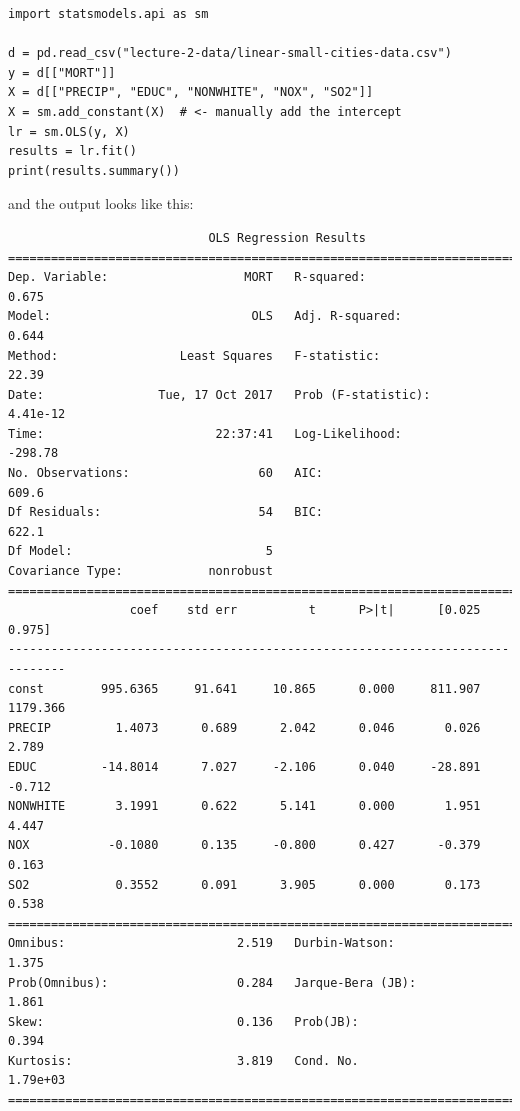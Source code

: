 {\small
\begin{verbatim}
import statsmodels.api as sm

d = pd.read_csv("lecture-2-data/linear-small-cities-data.csv")
y = d[["MORT"]]
X = d[["PRECIP", "EDUC", "NONWHITE", "NOX", "SO2"]]
X = sm.add_constant(X)  # <- manually add the intercept
lr = sm.OLS(y, X)
results = lr.fit()
print(results.summary())
\end{verbatim}
}
\noindent and the output looks like this:
{\small
\begin{verbatim}
                            OLS Regression Results                            
==============================================================================
Dep. Variable:                   MORT   R-squared:                       0.675
Model:                            OLS   Adj. R-squared:                  0.644
Method:                 Least Squares   F-statistic:                     22.39
Date:                Tue, 17 Oct 2017   Prob (F-statistic):           4.41e-12
Time:                        22:37:41   Log-Likelihood:                -298.78
No. Observations:                  60   AIC:                             609.6
Df Residuals:                      54   BIC:                             622.1
Df Model:                           5                                         
Covariance Type:            nonrobust                                         
==============================================================================
                 coef    std err          t      P>|t|      [0.025      0.975]
------------------------------------------------------------------------------
const        995.6365     91.641     10.865      0.000     811.907    1179.366
PRECIP         1.4073      0.689      2.042      0.046       0.026       2.789
EDUC         -14.8014      7.027     -2.106      0.040     -28.891      -0.712
NONWHITE       3.1991      0.622      5.141      0.000       1.951       4.447
NOX           -0.1080      0.135     -0.800      0.427      -0.379       0.163
SO2            0.3552      0.091      3.905      0.000       0.173       0.538
==============================================================================
Omnibus:                        2.519   Durbin-Watson:                   1.375
Prob(Omnibus):                  0.284   Jarque-Bera (JB):                1.861
Skew:                           0.136   Prob(JB):                        0.394
Kurtosis:                       3.819   Cond. No.                     1.79e+03
==============================================================================
\end{verbatim}
}

